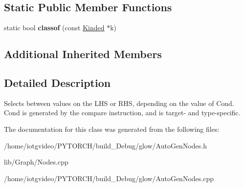 \subsection*{Static Public Member Functions}
\begin{DoxyCompactItemize}
\item 
\mbox{\label{classglow_1_1_select_node_a21f9548ce35fac651f9642c902e88b30}} 
static bool {\bfseries classof} (const \hyperlink{classglow_1_1_kinded}{Kinded} $\ast$k)
\end{DoxyCompactItemize}
\subsection*{Additional Inherited Members}


\subsection{Detailed Description}
Selects between values on the L\+HS or R\+HS, depending on the value of Cond. Cond is generated by the compare instruction, and is target-\/ and type-\/specific. 

The documentation for this class was generated from the following files\+:\begin{DoxyCompactItemize}
\item 
/home/iotgvideo/\+P\+Y\+T\+O\+R\+C\+H/build\+\_\+\+Debug/glow/Auto\+Gen\+Nodes.\+h\item 
lib/\+Graph/Nodes.\+cpp\item 
/home/iotgvideo/\+P\+Y\+T\+O\+R\+C\+H/build\+\_\+\+Debug/glow/Auto\+Gen\+Nodes.\+cpp\end{DoxyCompactItemize}
